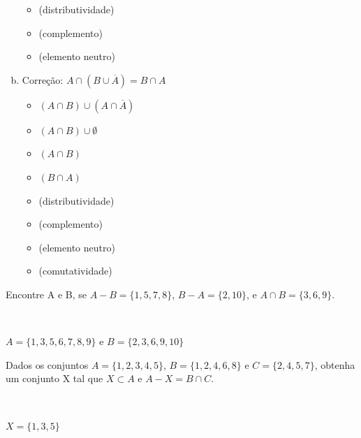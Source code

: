 \documentclass[a4paper, 12pt, addpoints]{exam}
\begin{document}
\begin{questions}
\begin{resp}
\begin{enumerate}[a)]
\begin{multicols}{2}
        \begin{itemize}
            \item (distributividade)
            \item (complemento)
            \item (elemento neutro)
        \end{itemize}
    \end{multicols}

    \item 
    
    Correção: $A \cap (B \cup \overline{A}) = B \cap A$
    
    \begin{multicols}{2}
        \begin{itemize}
            \item $(A \cap B) \cup (A \cap \overline{A})$
            \item $(A \cap B) \cup \emptyset$
            \item $(A \cap B)$
            \item $(B \cap A)$
        \end{itemize}

        \begin{itemize}
            \item (distributividade)
            \item (complemento)
            \item (elemento neutro)
            \item (comutatividade)
        \end{itemize}
    \end{multicols}
\end{enumerate}
\end{resp}


\question Encontre A e B, se $A - B = \{1, 5, 7, 8\}$, $B - A = \{2, 10\}$, e $A \cap B = \{3, 6, 9\}$.

\begin{resp}~
    
    $A=\{1,3,5,6,7,8,9\}$ e $B=\{2,3,6,9,10\}$
\end{resp}

\question Dados os conjuntos $A = \{1, 2, 3, 4, 5\}$, $B = \{1, 2, 4, 6, 8\}$ e $C = \{2, 4, 5, 7\}$, obtenha um conjunto X tal que $X \subset A$ e $A - X = B \cap C$.

\begin{resp}~
    
    $X=\{1,3,5\}$
\end{resp}



\end{questions}
\end{document}
